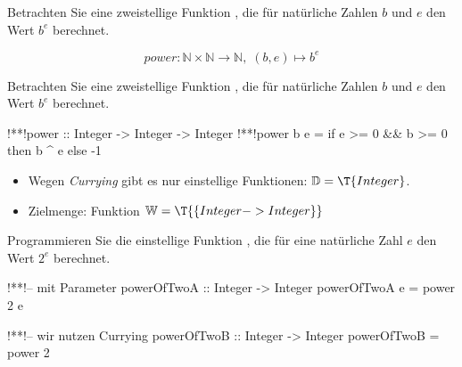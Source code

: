 \begin{frame}[fragile]\onslide<+->%
    \begin{exercise}
        Betrachten Sie eine zweistellige Funktion , die für natürliche Zahlen $b$ und $e$ den Wert $b^e$ berechnet.
    \end{exercise}
    \begin{solve}\onslide<+->
        $$power:\mathbb{N}\times\mathbb{N}\to\mathbb{N},\;(b,e)\mapsto b^e$$
    \end{solve}
\end{frame}
\addtocounter{exercise}{-1}\addtocounter{solve}{-1}%
\begin{frame}[fragile]\onslide<+->%
    \begin{exercise}
        Betrachten Sie eine zweistellige Funktion , die für natürliche Zahlen $b$ und $e$ den Wert $b^e$ berechnet.
    \end{exercise}
    \begin{solve}
    \begin{plainhaskell}
!*\onslide<+->*!power :: Integer -> Integer -> Integer
!*\onslide<+->*!power b e =
    if e >= 0 && b >= 0
    then b ^ e
    else -1
    \end{plainhaskell}\onslide<+->
    \begin{itemize}
        \item Wegen \textit{Currying} gibt es nur einstellige Funktionen: $\mathbb{D}=\T{Integer}$.
        \item Zielmenge: Funktion $\mathbb{W}=\T{\{Integer -> Integer\}}$
    \end{itemize}
    \end{solve}
\end{frame}
\addtocounter{exercise}{-1}\addtocounter{solve}{-1}%
\begin{frame}[fragile]\onslide<+->%
    \begin{exercise}
        Programmieren Sie die einstellige Funktion , die für eine natürliche Zahl $e$ den Wert $2^e$ berechnet.
    \end{exercise}
    \begin{solve}[c)]
    \begin{plainhaskell}
!*\onslide<+->*!-- mit Parameter
powerOfTwoA :: Integer -> Integer
powerOfTwoA e = power 2 e

!*\onslide<+->*!-- wir nutzen Currying
powerOfTwoB :: Integer -> Integer
powerOfTwoB = power 2
    \end{plainhaskell}
    \end{solve}
\end{frame}